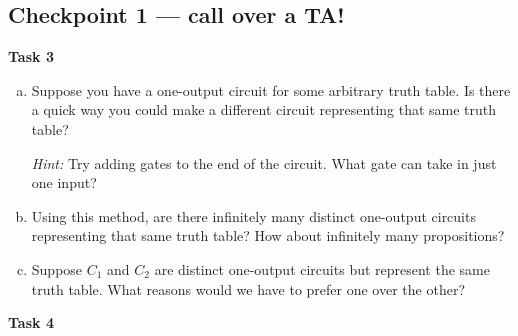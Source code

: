 \documentclass[12pt,letterpaper]{article}
\begin{document}
\subsection*{Checkpoint 1 — call over a TA!}

\newpage
\textbf{Task 3}

\begin{enumerate}[a.]

    \item Suppose you have a one-output circuit for some arbitrary truth table. Is there a quick way you could make a different circuit representing that same truth table?

    \textit{Hint:} Try adding gates to the end of the circuit. What gate can take in just one input?
    \begin{mdframed} \vspace{1cm} \end{mdframed}

    \item Using this method, are there infinitely many distinct one-output circuits representing that same truth table? How about infinitely many propositions?
    \begin{mdframed} \vspace{1cm} \end{mdframed}

    \item Suppose $C_1$ and $C_2$ are distinct one-output circuits but represent the same truth table. What reasons would we have to prefer one over the other? 

    \begin{mdframed} \vspace{1cm} \end{mdframed}

\end{enumerate}
\textbf{Task 4}
\end{document}
